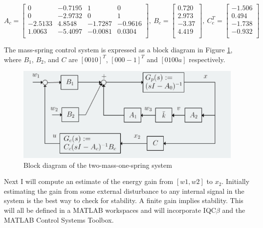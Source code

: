 \documentclass{article}[12pt]
\begin{document}
\begin{equation*}
     A_c = 
    \begin{bmatrix}
    0 & -0.7195 & 1 & 0 \\
    0 & -2.9732 & 0 & 1 \\
    -2.5133 & 4.8548 & -1.7287 & -0.9616 \\
    1.0063 & -5.4097 & -0.0081 & 0.0304 \\
    \end{bmatrix}, \:
    B_c = 
    \begin{bmatrix}
    0.720  \\
    2.973 \\
    -3.37 \\
    4.419 \\
    \end{bmatrix}, \:
     C_c^T = 
    \begin{bmatrix}
    -1.506  \\
    0.494 \\
    -1.738 \\
    -0.932 \\
    \end{bmatrix}
\end{equation*}

The mass-spring control system is expressed as a block diagram in Figure \ref{block_diagram}, where $B_1$, $B_2$, and $C$ are $[0010]^T$, $[000-1]^T$ and $[0100a]$ respectively.


\begin{figure}[h]
    \centering
    \includegraphics[width=.7\linewidth]{images/blockdiagram.PNG}
    \caption{Block diagram of the two-mass-one-spring system}
    \label{block_diagram}
\end{figure}

Next I will compute an estimate of the energy gain from $[w1, w2]$ to $x_2$. Initially estimating the gain from some external disturbance to any internal signal in the system is the best way to check for stability. A finite gain implies stability. This will all be defined in a MATLAB workspaces and will incorporate IQC$\beta$ and the MATLAB Control Systems Toolbox.
\end{document}

